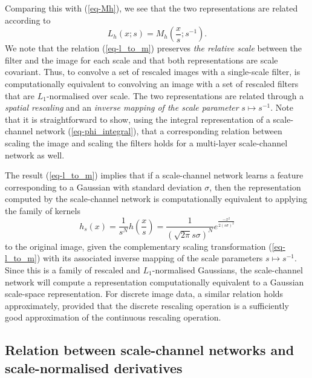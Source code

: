 \documentclass[twocolumn,runningheads]{svjour3}
\begin{document}
Comparing this with (\ref{eq-Mh}),
we see that the two representations are related according to 
\begin{equation}\label{eq-l_to_m}
L_h(x;s) = M_h(\frac{x}{s};s^{-1}).
\end{equation}
We note that the relation (\ref{eq-l_to_m}) preserves \emph{the
	relative scale} between the filter and the image for each scale and
that both representations are scale covariant.
Thus, to convolve a set of rescaled images with a single-scale filter, is computationally equivalent
to convolving an image with a set of rescaled filters that are
$L_1$-normalised over scale. The two representations are related
through a \emph{spatial rescaling} and an \emph{inverse mapping of the
	scale parameter} $s \mapsto s^{-1}$.
Note that it is straightforward to show, using the integral
representation of a scale-channel network (\ref{eq-phi_integral}),
that a corresponding relation between scaling the image and scaling
the filters holds for a multi-layer scale-channel network as well. 

The result (\ref{eq-l_to_m}) implies that if a scale-channel network
learns a feature corresponding to a Gaussian with standard
deviation $\sigma$,
then the representation computed by the scale-channel network is
computationally equivalent to applying the family of kernels
\begin{equation}
h_s(x) = \frac{1}{s^N} h(\frac{x}{s}) = \frac{1}{(\sqrt{2\pi} s\sigma)^{N}}  e^{\frac{-x^2}{2 (s\sigma)^2}}
\end{equation}
to the original image, given the complementary scaling transformation
(\ref{eq-l_to_m}) with its associated inverse mapping of
the scale parameters $s \mapsto s^{-1}$.
Since this is a family of rescaled and $L_1$-normalised Gaussians, the
scale-channel network will compute a representation computationally
equivalent to a Gaussian scale-space representation. 
For discrete image data, a similar relation holds approximately,
provided that the discrete rescaling operation is a sufficiently good approximation of the continuous rescaling operation. 

\subsection{Relation between scale-channel networks and scale-normalised derivatives}
\end{document}
